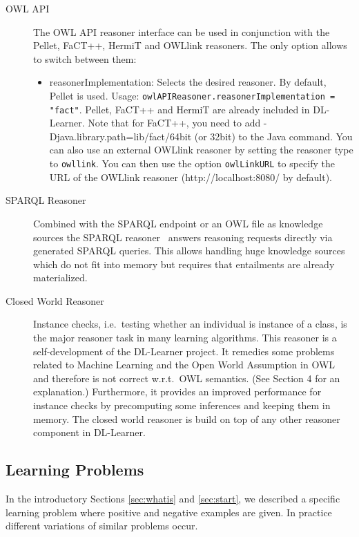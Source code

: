 \documentclass[a4paper,12pt]{scrartcl}
\begin{document}
\begin{description}
 \item[OWL API] The OWL API reasoner interface can be used in conjunction with the Pellet, FaCT++, HermiT and OWLlink reasoners. The only option allows to switch between them:
 \begin{itemize}
  \item reasonerImplementation: Selects the desired reasoner. By default, Pellet is used. Usage: \verb|owlAPIReasoner.reasonerImplementation = "fact"|. Pellet, FaCT++ and HermiT are already included in DL-Learner. Note that for FaCT++, you need to add -Djava.library.path=lib/fact/64bit (or 32bit) to the Java command. You can also use an external OWLlink reasoner by setting the reasoner type to \verb|owllink|. You can then use the option \verb|owlLinkURL| to specify the URL of the OWLlink reasoner (http://localhost:8080/ by default).
 \end{itemize}
 \item[SPARQL Reasoner] Combined with the SPARQL endpoint or an OWL file as knowledge sources the SPARQL reasoner~\cite{sparqllearner} answers reasoning requests directly via generated SPARQL queries. This allows handling huge knowledge sources which do not fit into memory but requires that entailments are already materialized.
 \item[Closed World Reasoner] Instance checks, i.e.~testing whether an individual is instance of a class, is the major reasoner task in many learning algorithms. This reasoner is a self-development of the DL-Learner project. It remedies some problems related to Machine Learning and the Open World Assumption in OWL and therefore is not correct w.r.t.~OWL semantics. (See \cite{cheng00} Section 4 for an explanation.) Furthermore, it provides an improved performance for instance checks by precomputing some inferences and keeping them in memory. The closed world reasoner is build on top of any other reasoner component in DL-Learner.
\end{description}

\subsection{Learning Problems}

In the introductory Sections \ref{sec:whatis} and \ref{sec:start}, we described a specific learning problem where positive and negative examples are given. In practice different variations of similar problems occur. 
\end{document}
